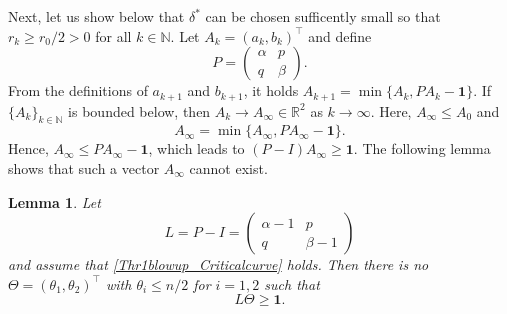 \documentclass[11pt,reqno]{amsart}
\newtheorem{lemma}{Lemma}[section]
\begin{document}
	Next, let us show below that
	$\delta^*$ can be chosen sufficently small so that $r_k\geq r_0/2>0$ for all $k\in \mathbb N$. Let $A_k=(a_k,b_k)^{\top}$ and define
	\[
	P=\begin{pmatrix}\alpha&p\\ q&\beta\end{pmatrix}.
	\]
	From the definitions of $a_{k+1}$ and $b_{k+1}$, it holds $A_{k+1}=\min\{A_k,PA_k-\boldsymbol{1}\}$. If $\{A_k\}_{k\in \mathbb N}$ is bounded below, then $A_k\to A_{\infty}\in\mathbb{R}^2$ as $k\to\infty$. Here, $A_{\infty}\leq A_{0}$ and  
	\[
	A_{\infty}=\min\{A_{\infty},PA_{\infty}-\boldsymbol{1}\}.
	\]
	Hence, $A_{\infty}\leq PA_{\infty}-\boldsymbol{1}$, which leads to $(P-I)A_{\infty}\geq \boldsymbol{1}$. The following lemma shows that such a vector $A_{\infty}$ cannot exist.
	\begin{lemma}\label{lem_matrix}
		Let
		\[
		L=P-I=\begin{pmatrix}\alpha-1&p\\ q&\beta-1\end{pmatrix}
		\]
		and assume that \eqref{Thr1blowup_Criticalcurve} holds. Then there is no $\Theta=(\theta_1,\theta_2)^{\top}$ with $\theta_i\leq n/2$ for $i=1,2$ such that
		\[
		L\Theta\geq \boldsymbol{1}.
		\]
	\end{lemma}
	
\end{document}
